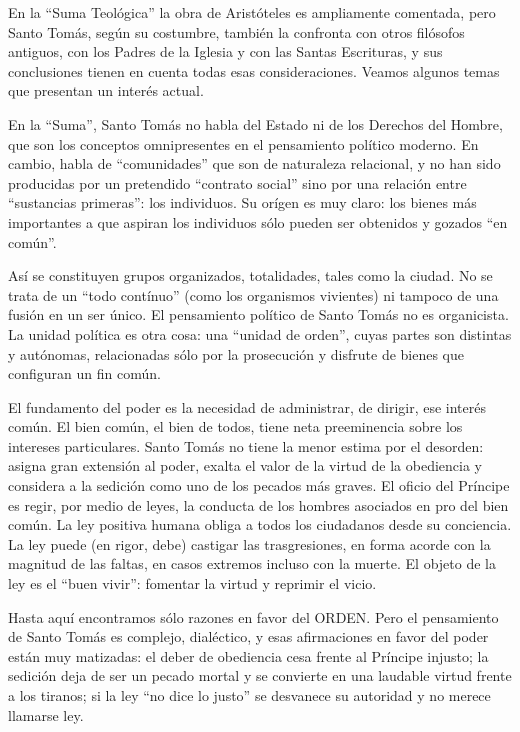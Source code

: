 \documentclass[
]{book}
\begin{document}
En la ``Suma Teológica'' la obra de Aristóteles es ampliamente comentada, pero Santo Tomás, según su costumbre, también la confronta con otros filósofos antiguos, con los Padres de la Iglesia y con las Santas Escrituras, y sus conclusiones tienen en cuenta todas esas consideraciones. Veamos algunos temas que presentan un interés actual.

En la ``Suma'', Santo Tomás no habla del Estado ni de los Derechos del Hombre, que son los conceptos omnipresentes en el pensamiento político moderno. En cambio, habla de ``comunidades'' que son de naturaleza relacional, y no han sido producidas por un pretendido ``contrato social'' sino por una relación entre ``sustancias primeras'': los individuos. Su orígen es muy claro: los bienes más importantes a que aspiran los individuos sólo pueden ser obtenidos y gozados ``en común''.

Así se constituyen grupos organizados, totalidades, tales como la ciudad. No se trata de un ``todo contínuo'' (como los organismos vivientes) ni tampoco de una fusión en un ser único. El pensamiento político de Santo Tomás no es organicista. La unidad política es otra cosa: una ``unidad de orden'', cuyas partes son distintas y autónomas, relacionadas sólo por la prosecución y disfrute de bienes que configuran un fin común.

El fundamento del poder es la necesidad de administrar, de dirigir, ese interés común. El bien común, el bien de todos, tiene neta preeminencia sobre los intereses particulares. Santo Tomás no tiene la menor estima por el desorden: asigna gran extensión al poder, exalta el valor de la virtud de la obediencia y considera a la sedición como uno de los pecados más graves. El oficio del Príncipe es regir, por medio de leyes, la conducta de los hombres asociados en pro del bien común. La ley positiva humana obliga a todos los ciudadanos desde su conciencia. La ley puede (en rigor, debe) castigar las trasgresiones, en forma acorde con la magnitud de las faltas, en casos extremos incluso con la muerte. El objeto de la ley es el ``buen vivir'': fomentar la virtud y reprimir el vicio.

Hasta aquí encontramos sólo razones en favor del ORDEN. Pero el pensamiento de Santo Tomás es complejo, dialéctico, y esas afirmaciones en favor del poder están muy matizadas: el deber de obediencia cesa frente al Príncipe injusto; la sedición deja de ser un pecado mortal y se convierte en una laudable virtud frente a los tiranos; si la ley ``no dice lo justo'' se desvanece su autoridad y no merece llamarse ley.
\end{document}
